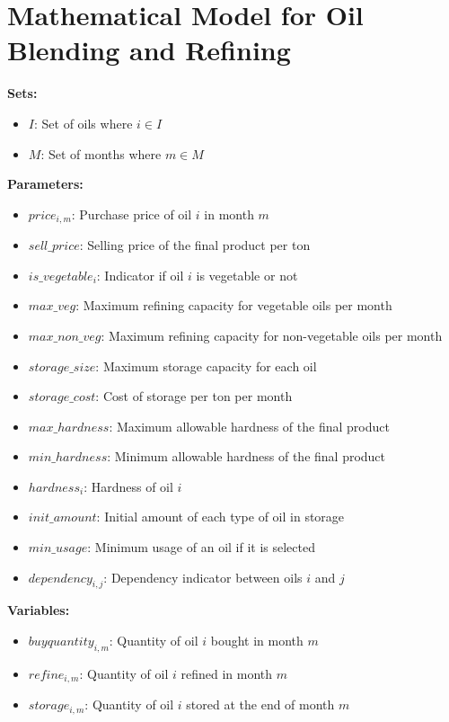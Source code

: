 \documentclass{article}
\begin{document}
\section*{Mathematical Model for Oil Blending and Refining}

\textbf{Sets:}
\begin{itemize}
    \item \( I \): Set of oils where \( i \in I \)
    \item \( M \): Set of months where \( m \in M \)
\end{itemize}

\textbf{Parameters:}
\begin{itemize}
    \item \( price_{i,m} \): Purchase price of oil \( i \) in month \( m \)
    \item \( sell\_price \): Selling price of the final product per ton
    \item \( is\_vegetable_{i} \): Indicator if oil \( i \) is vegetable or not
    \item \( max\_veg \): Maximum refining capacity for vegetable oils per month
    \item \( max\_non\_veg \): Maximum refining capacity for non-vegetable oils per month
    \item \( storage\_size \): Maximum storage capacity for each oil
    \item \( storage\_cost \): Cost of storage per ton per month
    \item \( max\_hardness \): Maximum allowable hardness of the final product
    \item \( min\_hardness \): Minimum allowable hardness of the final product
    \item \( hardness_{i} \): Hardness of oil \( i \)
    \item \( init\_amount \): Initial amount of each type of oil in storage
    \item \( min\_usage \): Minimum usage of an oil if it is selected
    \item \( dependency_{i,j} \): Dependency indicator between oils \( i \) and \( j \) 
\end{itemize}

\textbf{Variables:}
\begin{itemize}
    \item \( buyquantity_{i,m} \): Quantity of oil \( i \) bought in month \( m \)
    \item \( refine_{i,m} \): Quantity of oil \( i \) refined in month \( m \)
    \item \( storage_{i,m} \): Quantity of oil \( i \) stored at the end of month \( m \)
\end{itemize}
\end{document}
